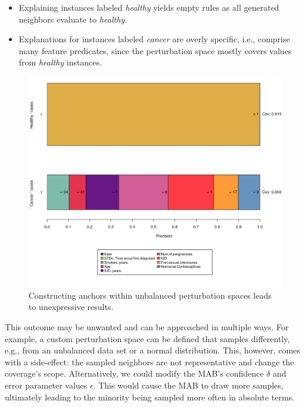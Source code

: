 \documentclass[12pt,]{krantz}
\providecommand{\tightlist}{%
  \setlength{\itemsep}{0pt}\setlength{\parskip}{0pt}}
\begin{document}
\begin{itemize}
\tightlist
\item
  Explaining instances labeled \emph{healthy} yields empty rules as all
  generated neighbors evaluate to \emph{healthy}.
\item
  Explanations for instances labeled \emph{cancer} are overly specific,
  i.e., comprise many feature predicates, since the perturbation space
  mostly covers values from \emph{healthy} instances.
\end{itemize}

\begin{figure}

{\centering \includegraphics[width=\textwidth]{images/unnamed-chunk-37-1} 

}

\caption{Constructing anchors within unbalanced perturbation spaces leads to unexpressive results.}\label{fig:unnamed-chunk-37}
\end{figure}

This outcome may be unwanted and can be approached in multiple ways. For
example, a custom perturbation space can be defined that samples
differently, e.g., from an unbalanced data set or a normal distribution.
This, however, comes with a side-effect: the sampled neighbors are not
representative and change the coverage's scope. Alternatively, we could
modify the MAB's confidence \(\delta\) and error parameter values
\(\epsilon\). This would cause the MAB to draw more samples, ultimately
leading to the minority being sampled more often in absolute terms.
\end{document}
